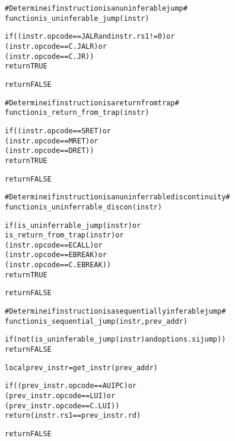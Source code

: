 \pagebreak

\begin{alltt}
# Determine if instruction is an uninferable jump #
function is_uninferable_jump (instr)

  if ((instr.opcode == JALR and instr.rs1 != 0) or
      (instr.opcode == C.JALR)                  or
      (instr.opcode == C.JR))
    return TRUE

  return FALSE

# Determine if instruction is a return from trap #
function is_return_from_trap (instr)

  if ((instr.opcode == SRET)      or
      (instr.opcode == MRET)      or
      (instr.opcode == DRET))
    return TRUE

  return FALSE

# Determine if instruction is an uninferrable discontinuity #
function is_uninferrable_discon (instr)

  if (is_uninferrable_jump(instr) or
      is_return_from_trap (instr) or
      (instr.opcode == ECALL)     or
      (instr.opcode == EBREAK)    or
      (instr.opcode == C.EBREAK))
    return TRUE

  return FALSE

# Determine if instruction is a sequentially inferable jump #
function is_sequential_jump (instr, prev_addr)

  if (not (is_uninferable_jump(instr) and options.sijump))
    return FALSE

  local prev_instr = get_instr(prev_addr)

  if((prev_instr.opcode == AUIPC) or
     (prev_instr.opcode == LUI)   or
     (prev_instr.opcode == C.LUI))
    return (instr.rs1 == prev_instr.rd)

  return FALSE
\end{alltt}

\pagebreak


